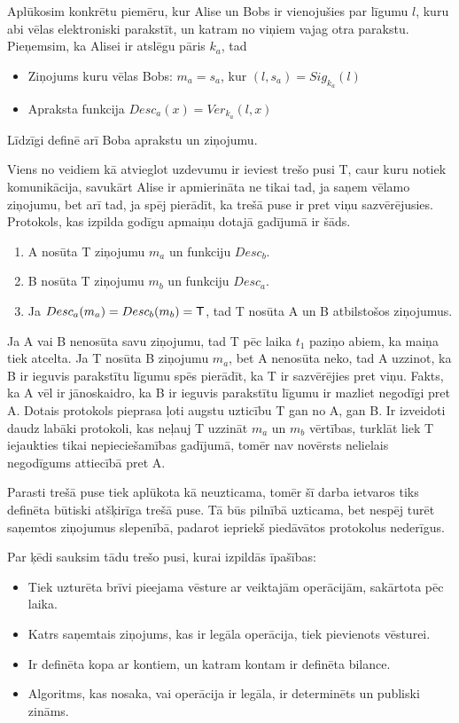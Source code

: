 Aplūkosim konkrētu piemēru, kur Alise un Bobs ir vienojušies par līgumu $l$, kuru abi vēlas elektroniski parakstīt, un katram no viņiem vajag otra parakstu. Pieņemsim, ka Alisei ir atslēgu pāris $k_a$, tad
\begin{itemize}
    \item Ziņojums kuru vēlas Bobs: $m_a = s_a$, kur $(l, s_a) = Sig_{k_a}(l)$
    \item Apraksta funkcija $Desc_a(x) = Ver_{k_a}(l, x)$
\end{itemize}
Līdzīgi definē arī Boba aprakstu un ziņojumu.

Viens no veidiem kā atvieglot uzdevumu ir ieviest trešo pusi T, caur kuru notiek komunikācija, savukārt Alise ir apmierināta ne tikai tad, ja saņem vēlamo ziņojumu, bet arī tad, ja spēj pierādīt, ka trešā puse ir pret viņu sazvērējusies.
Protokols, kas izpilda godīgu apmaiņu dotajā gadījumā ir šāds.
\begin{enumerate}
    \item A nosūta T ziņojumu $m_a$ un funkciju $Desc_b$.
    \item B nosūta T ziņojumu $m_b$ un funkciju $Desc_a$.
    \item Ja $Desc_a(m_a) = Desc_b(m_b) = \textsf{T}$, tad T nosūta A un B atbilstošos ziņojumus.
\end{enumerate}
Ja A vai B nenosūta savu ziņojumu, tad T pēc laika $t_1$ paziņo abiem, ka maiņa tiek atcelta. Ja T nosūta B ziņojumu $m_a$, bet A nenosūta neko, tad A uzzinot, ka B ir ieguvis parakstītu līgumu spēs pierādīt, ka T ir sazvērējies pret viņu. Fakts, ka A vēl ir jānoskaidro, ka B ir ieguvis parakstītu līgumu ir mazliet negodīgi pret A. Dotais protokols pieprasa ļoti augstu uzticību T gan no A, gan B. Ir izveidoti daudz labāki protokoli, kas neļauj T uzzināt $m_a$ un $m_b$ vērtības, turklāt liek T iejaukties tikai nepieciešamības gadījumā, tomēr nav novērsts nelielais negodīgums attiecībā pret A.\cite{asokan98}

Parasti trešā puse tiek aplūkota kā neuzticama, tomēr šī darba ietvaros tiks definēta būtiski atšķirīga trešā puse. Tā būs pilnībā uzticama, bet nespēj turēt saņemtos ziņojumus slepenībā, padarot iepriekš piedāvātos protokolus nederīgus.

Par ķēdi sauksim tādu trešo pusi, kurai izpildās īpašības:
\begin{itemize}
    \item Tiek uzturēta brīvi pieejama vēsture ar veiktajām operācijām, sakārtota pēc laika.
    \item Katrs saņemtais ziņojums, kas ir legāla operācija, tiek pievienots vēsturei.
    \item Ir definēta kopa ar kontiem, un katram kontam ir definēta bilance.
    \item Algoritms, kas nosaka, vai operācija ir legāla, ir determinēts un publiski zināms.
\end{itemize}

